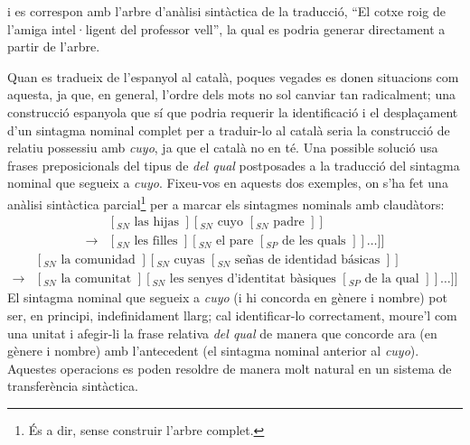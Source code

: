 i es correspon amb l'arbre d'anàlisi sintàctica de la
traducció, ``El cotxe roig de l'amiga intel·ligent del professor
vell'', la qual es podria generar directament a partir de l'arbre.

Quan es tradueix de l'espanyol al català, poques vegades es
donen situacions com aquesta, ja que, en general, l'ordre dels mots no
sol canviar tan radicalment; una construcció espanyola que sí que
podria requerir la identificació i el desplaçament d'un
sintagma nominal complet per a traduir-lo al català seria la
construcció de relatiu possessiu amb \emph{cuyo}, ja que el
català no en té. Una possible solució usa frases
preposicionals del tipus de \emph{del qual} postposades a la
traducció del sintagma nominal que segueix a \emph{cuyo}. Fixeu-vos en
aquests dos exemples, on s'ha fet una anàlisi sintàctica
parcial\footnote{És a dir, sense construir l'arbre complet.}
per a marcar els sintagmes nominals amb claudàtors:
$$\begin{array}{ll}
& [_{SN} \mbox{ las hijas }] [_{SN} \mbox{ cuyo } [_{SN} \mbox{ padre } ] ] 
\\ \rightarrow  &
[_{SN} \mbox{ les filles } ] [_{SN}
\mbox{ el pare } [_{SP} \mbox{ de les quals } ] ] \ldots ] ] 
\end{array}
$$
$$
\begin{array}{ll}
& [_{SN} \mbox{ la comunidad }] [_{SN} \mbox{ cuyas } [_{SN} \mbox{ se\~{n}as de
identidad básicas } ] ]
\\ \rightarrow &
[_{SN} \mbox{ la comunitat }] [_{SN}
\mbox{ les senyes d'identitat bàsiques } [_{SP} \mbox{ de la qual } ] ] \ldots ] ] 
\end{array}
$$
El sintagma nominal que segueix a \emph{cuyo} (i hi concorda en gènere
i nombre) 
pot ser, en principi, indefinidament llarg;
cal identificar-lo correctament, moure'l com una unitat i afegir-li la frase 
relativa {\em
del qual} de manera que 
concorde ara (en gènere i nombre) amb l'antecedent (el sintagma nominal
anterior al \emph{cuyo}). Aquestes operacions es poden resoldre de
manera molt natural en un sistema de transferència sintàctica.

